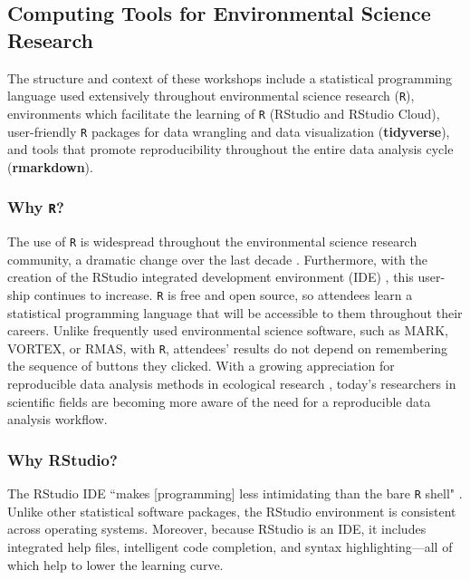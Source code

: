 \documentclass[12pt]{article}
\begin{document}
\subsection{Computing Tools for Environmental Science Research}  

\noindent The structure and context of these workshops include a statistical
programming language used extensively throughout environmental science research
(\texttt{R}), environments which facilitate the learning of \texttt{R}
(RStudio and RStudio Cloud), user-friendly \texttt{R} packages for data
wrangling and data visualization (\textbf{tidyverse}), and tools that promote
reproducibility throughout the entire data analysis cycle (\textbf{rmarkdown}).

\subsubsection{Why \texttt{R}?} 

\noindent The use of \texttt{R} is widespread throughout the environmental science
research community, a dramatic change over the last decade \citep{Rpopular}. 
Furthermore, with the creation of the RStudio integrated development 
environment (IDE) \citep{rstudio}, this user-ship continues to increase. 
\texttt{R} is free and open source, so attendees learn a statistical
programming language that will be accessible to them throughout their careers.
Unlike frequently used environmental science software, such as MARK, VORTEX, or
RMAS, with \texttt{R}, attendees' results do not depend
on remembering the sequence of buttons they clicked. With a growing appreciation
for reproducible data analysis methods in ecological research 
\citep{reproducibilty-comment, repeatability, pva, reproducibility_ecology},
today's researchers in scientific fields are becoming more aware of the need for
a reproducible data analysis workflow. 

\subsubsection{Why RStudio?}

\noindent The RStudio IDE ``makes [programming] less
intimidating than the bare \texttt{R} shell" \citep[p.\ 59]{mine}. Unlike other 
statistical software packages, the RStudio environment is consistent across
operating systems. Moreover, because RStudio is an IDE, it includes integrated
help files, intelligent code completion, and syntax highlighting---all of which
help to lower the learning curve. 
\end{document}
